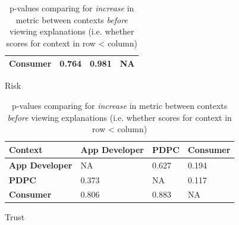 \begin{table}[!ht]
\begin{subtable}[h]{1\textwidth}
\begin{tabular}{|l|l|l|l|}
      \hline
      \textbf{Consumer}      & 0.764                  & 0.981         & NA               \\
      \hline
    \end{tabular}
  \caption{Risk}
  \label{tab:risk_before}
  \end{subtable}
  \vfill
  \begin{subtable}[h]{1\textwidth}
    \centering
    \begin{tabular}{|l|l|l|l|}
      \hline
      \textbf{Context}       & \textbf{App Developer} & \textbf{PDPC} & \textbf{Consumer} \\ \hline
      \textbf{App Developer} & NA                     & 0.627         & 0.194             \\ \hline
      \textbf{PDPC}          & 0.373                  & NA            & 0.117             \\ \hline
      \textbf{Consumer}      & 0.806                  & 0.883         & NA                \\ \hline
      \end{tabular}
  \caption{Trust}
  \label{tab:trust_before}
  \end{subtable}
  \caption{p-values comparing for \textit{increase} in metric between contexts \textit{before} viewing explanations (i.e. whether scores for context in row \textless{} column)}
  \label{tab:context_comparison_3}
\end{table}

